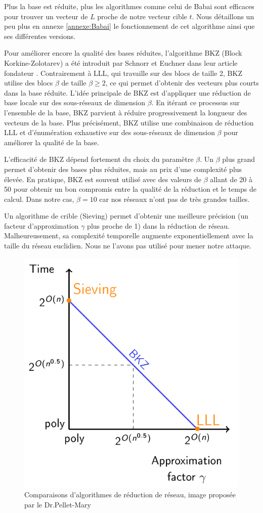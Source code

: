 \documentclass{backend}
\begin{document}
Plus la base est réduite, plus les algorithmes comme celui de Babai sont efficaces pour trouver un vecteur de $L$ proche de notre vecteur cible $t$. Nous détaillons un peu plus en annexe \ref{annexe:Babai} le fonctionnement de cet algorithme ainsi que ses différentes versions.\smallbreak


Pour améliorer encore la qualité des bases réduites, l'algorithme BKZ (Block Korkine-Zolotarev) a été introduit par Schnorr et Euchner dans leur article fondateur \cite{bkz}. Contrairement à LLL, qui travaille sur des blocs de taille 2, BKZ utilise des blocs $\beta$ de taille $\beta \geq 2$, ce qui permet d'obtenir des vecteurs plus courts dans la base réduite. L'idée principale de BKZ est d'appliquer une réduction de base locale sur des sous-réseaux de dimension $\beta$. En itérant ce processus sur l'ensemble de la base, BKZ parvient à réduire progressivement la longueur des vecteurs de la base. Plus précisément, BKZ utilise une combinaison de réduction LLL et d'énumération exhaustive sur des sous-réseaux de dimension $\beta$ pour améliorer la qualité de la base.\smallbreak

L'efficacité de BKZ dépend fortement du choix du paramètre $\beta$. Un $\beta$ plus grand permet d'obtenir des bases plus réduites, mais au prix d'une complexité plus élevée. En pratique, BKZ est souvent utilisé avec des valeurs de $\beta$ allant de 20 à 50 pour obtenir un bon compromis entre la qualité de la réduction et le temps de calcul. Dans notre cas, $\beta = 10$  car nos réseaux n'ont pas de très grandes tailles.\smallbreak

Un algorithme de crible (Sieving) \cite{Sieving} permet d'obtenir une meilleure précision (un facteur d'approximation $\gamma$ plus proche de 1) dans la réduction de réseau. Malheureusement, sa complexité temporelle augmente exponentiellement avec la taille du réseau euclidien. Nous ne l'avons pas utilisé pour mener notre attaque.

\begin{figure}[H]
    \centering
    \includegraphics[width=0.4\linewidth]{img/AlicePM_lattices/Screenshot 2025-02-20 at 10-56-37 Lattice reduction algorithms - cryptanalysis.pdf.png}
    \caption{Comparaisons d'algorithmes de réduction de réseau, image proposée par le Dr.Pellet-Mary \cite{AlicePelletMary}}
    \label{fig:SVP_algos}
\end{figure}
\end{document}
